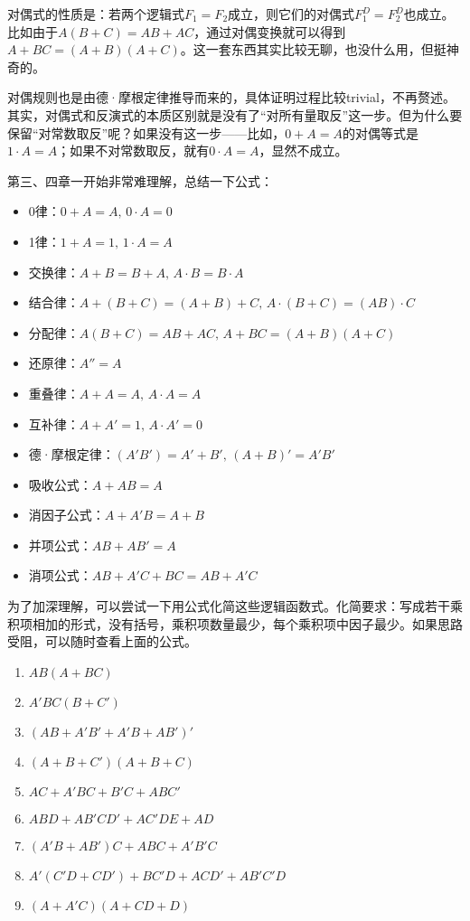 \documentclass[UTF8]{ctexart}
\begin{document}
对偶式的性质是：若两个逻辑式$F_1=F_2$成立，则它们的对偶式$F_1^D=F_2^D$也成立。比如由于$A(B+C)=AB+AC$，通过对偶变换就可以得到$A+BC=(A+B)(A+C)$。这一套东西其实比较无聊，也没什么用，但挺神奇的。

对偶规则也是由德·摩根定律推导而来的，具体证明过程比较trivial，不再赘述。其实，对偶式和反演式的本质区别就是没有了“对所有量取反”这一步。但为什么要保留“对常数取反”呢？如果没有这一步——比如，$0+A=A$的对偶等式是$1\cdot A=A$；如果不对常数取反，就有$0\cdot A=A$，显然不成立。

\divider

第三、四章一开始非常难理解，总结一下公式：

\begin{itemize}
\item 0律：$0+A=A,\,0\cdot A=0$
\item 1律：$1+A=1,\,1\cdot A=A$
\item 交换律：$A+B=B+A,\,A\cdot B=B\cdot A$
\item 结合律：$A+(B+C)=(A+B)+C,\,A\cdot(B+C)=(AB)\cdot C$
\item 分配律：$A(B+C)=AB+AC,\,A+BC=(A+B)(A+C)$
\item 还原律：$A''=A$
\item 重叠律：$A+A=A,\,A\cdot A=A$
\item 互补律：$A+A'=1,\,A\cdot A'=0$
\item 德·摩根定律：$(A'B')=A'+B',\,(A+B)'=A'B'$
\item 吸收公式：$A+AB=A$
\item 消因子公式：$A+A'B=A+B$
\item 并项公式：$AB+AB'=A$
\item 消项公式：$AB+A'C+BC=AB+A'C$
\end{itemize}

为了加深理解，可以尝试一下用公式化简这些逻辑函数式。化简要求：写成若干乘积项相加的形式，没有括号，乘积项数量最少，每个乘积项中因子最少。如果思路受阻，可以随时查看上面的公式。

\begin{enumerate}
\item $AB(A+BC)$
\item $A'BC(B+C')$
\item $(AB+A'B'+A'B+AB')'$
\item $(A+B+C')(A+B+C)$
\item $AC+A'BC+B'C+ABC'$
\item $ABD+AB'CD'+AC'DE+AD$
\item $(A'B+AB')C+ABC+A'B'C$
\item $A'(C'D+CD')+BC'D+ACD'+AB'C'D$
\item $(A+A'C)(A+CD+D)$\cite{exercise}
\end{enumerate}
\end{document}
